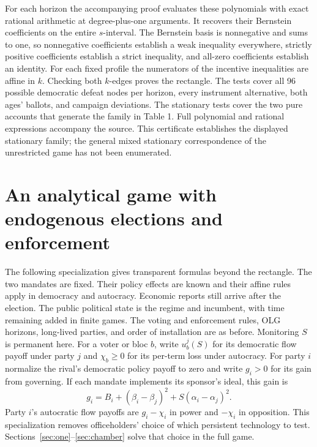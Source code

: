 \documentclass[11pt,letterpaper]{article}
\begin{document}
For each horizon the accompanying proof evaluates these polynomials with exact rational arithmetic at degree-plus-one arguments. It recovers their Bernstein coefficients on the entire \(s\)-interval. The Bernstein basis is nonnegative and sums to one, so nonnegative coefficients establish a weak inequality everywhere, strictly positive coefficients establish a strict inequality, and all-zero coefficients establish an identity. For each fixed profile the numerators of the incentive inequalities are affine in \(k\). Checking both \(k\)-edges proves the rectangle. The tests cover all 96 possible democratic defeat nodes per horizon, every instrument alternative, both ages' ballots, and campaign deviations. The stationary tests cover the two pure accounts that generate the family in Table 1. Full polynomial and rational expressions accompany the source. This certificate establishes the displayed stationary family; the general mixed stationary correspondence of the unrestricted game has not been enumerated.

\newpage
\section{An analytical game with endogenous elections and enforcement}\label{sec:ballots}
The following specialization gives transparent formulas beyond the rectangle. The two mandates are fixed. Their policy effects are known and their affine rules apply in democracy and autocracy. Economic reports still arrive after the election. The public political state is the regime and incumbent, with time remaining added in finite games. The voting and enforcement rules, OLG horizons, long-lived parties, and order of installation are as before. Monitoring \(S\) is permanent here. For a voter or bloc \(b\), write \(u_b^j(S)\) for its democratic flow payoff under party \(j\) and \(\chi_b\ge0\) for its per-term loss under autocracy. For party \(i\) normalize the rival's democratic policy payoff to zero and write \(g_i>0\) for its gain from governing. If each mandate implements its sponsor's ideal, this gain is
\[
 g_i=B_i+(\beta_i-\beta_j)^2+S(\alpha_i-\alpha_j)^2 .
\]
Party \(i\)'s autocratic flow payoffs are \(g_i-\chi_i\) in power and \(-\chi_i\) in opposition. This specialization removes officeholders' choice of which persistent technology to test. Sections~\ref{sec:one}--\ref{sec:chamber} solve that choice in the full game.
\end{document}

